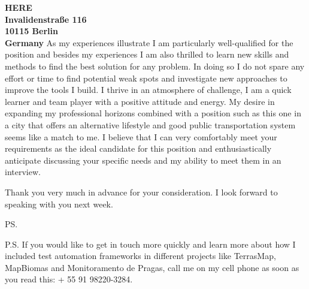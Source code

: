 \documentclass[a4paper]{joaosoares-letter}
\begin{document}
\begin{letter}{\bfseries HERE\\Invalidenstraße 116\\10115 Berlin\\Germany}
As my experiences illustrate I am particularly well-qualified for the position and besides my experiences I am also thrilled to learn new skills and methods to find the best solution for any problem. In doing so I do not spare any effort or time to find potential weak spots and investigate new approaches to improve the tools I build. I thrive in an atmosphere of challenge, I am a quick learner and team player with a positive attitude and energy. My desire in expanding my professional horizons combined with a position such as this one in a city that offers an alternative lifestyle and good public transportation system seems like a match to me. I believe that I can very comfortably meet your requirements as the ideal candidate for this position and enthusiastically anticipate discussing your specific needs and my ability to meet them in an interview.

\closing{Thank you very much in advance for your consideration. I look forward to speaking with you next week.}
\vspace{10pt}
\ps

P.S. If you would like to get in touch more quickly and learn more about how I included test automation frameworks in different projects like TerrasMap, MapBiomas and Monitoramento de Pragas, call me on my cell phone as soon as you read this: + 55 91 98220-3284.
\vspace{\fill}

\end{letter}
\end{document}
